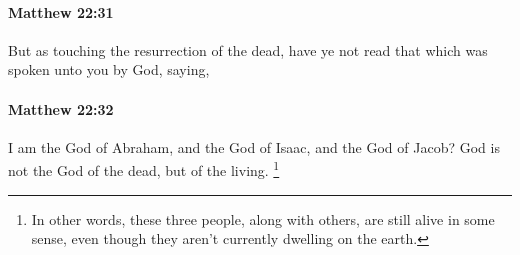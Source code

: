 		\paragraph{Matthew 22:31} %
			\label{MATTHEW-22-31}

			But as touching the resurrection of the dead, have ye not read that which was spoken unto you by God, saying,

			\begin{framed}
			\scriptsize
				\begin{compactdesc}
					\item[SBLG] 
				\end{compactdesc}
			\end{framed}

		\paragraph{Matthew 22:32} %
			\label{MATTHEW-22-32}

			I am the God of Abraham, and the God of Isaac, and the God of Jacob? God is not the God of the dead, but of the living.%
				\footnote{%
					In other words, these three people, along with others, are still alive in some sense, even though they aren't currently dwelling on the earth.
					}

